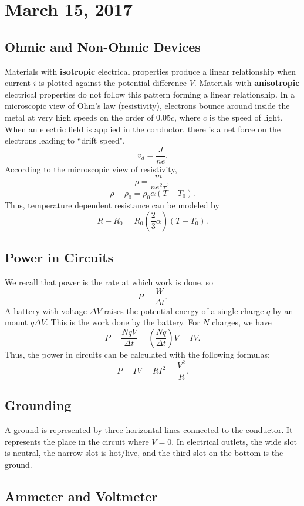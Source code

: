 \documentclass[11pt]{article}
\theoremstyle{plain} %
\theoremstyle{definition}
\theoremstyle{example}
\theoremstyle{remark}
\begin{document}
\section{March 15, 2017}

\subsection{Ohmic and Non-Ohmic Devices}
Materials with \textbf{isotropic} electrical properties produce a linear relationship when current $i$ is plotted against the potential difference $V$. Materials with \textbf{anisotropic} electrical properties do not follow this pattern forming a linear relationship. In a microscopic view of Ohm's law (resistivity), electrons bounce around inside the metal at very high speeds on the order of $0.05c$, where $c$ is the speed of light. When an electric field is applied in the conductor, there is a net force on the electrons leading to ``drift speed",
$$v_d = \frac{J}{ne}.$$
According to the microscopic view of resistivity, 
$$\rho = \frac{m}{ne^2\tau},$$
$$\rho - \rho_0 = \rho_0\alpha(T-T_0).$$
Thus, temperature dependent resistance can be modeled by 
$$R - R_0 = R_0\left(\frac{2}{3}\alpha\right)(T-T_0).$$

\subsection{Power in Circuits}
We recall that power is the rate at which work is done, so 
$$P = \frac{W}{\Delta t}.$$
A battery with voltage $\Delta V$ raises the potential energy of a single charge $q$ by an mount $q\Delta V$. This is the work done by the battery. For $N$ charges, we have 
$$P = \frac{NqV}{\Delta t} = \left(\frac{Nq}{\Delta t}\right)V = IV.$$
Thus, the power in circuits can be calculated with the following formulas:
$$P = IV = RI^2 = \frac{V^2}{R}.$$

\subsection{Grounding}
A ground is represented by three horizontal lines connected to the conductor. It represents the place in the circuit where $V=0$. In electrical outlets, the wide slot is neutral, the narrow slot is hot/live, and the third slot on the bottom is the ground. 

\subsection{Ammeter and Voltmeter}
\end{document}
